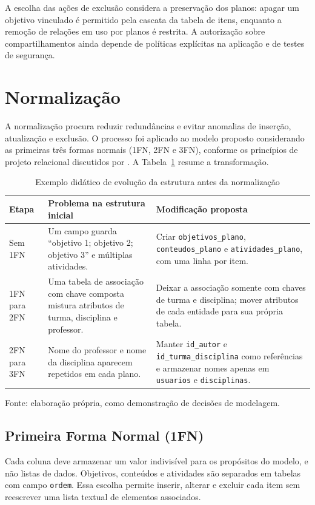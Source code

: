 \documentclass[12pt,a4paper,oneside]{report}
\begin{document}
A escolha das ações de exclusão considera a preservação dos planos: apagar um objetivo vinculado é permitido pela cascata da tabela de itens, enquanto a remoção de relações em uso por planos é restrita. A autorização sobre compartilhamentos ainda depende de políticas explícitas na aplicação e de testes de segurança.

\section{Normalização}
A normalização procura reduzir redundâncias e evitar anomalias de inserção, atualização e exclusão. O processo foi aplicado ao modelo proposto considerando as primeiras três formas normais (1FN, 2FN e 3FN), conforme os princípios de projeto relacional discutidos por \citet{silberschatz2020}. A Tabela~\ref{tab:normalizacao-exemplo} resume a transformação.

\begin{table}[htbp]
\centering
\caption{Exemplo didático de evolução da estrutura antes da normalização}
\label{tab:normalizacao-exemplo}
\footnotesize
\begin{tabularx}{\textwidth}{@{}p{2.1cm}X X@{}}
\toprule
\textbf{Etapa} & \textbf{Problema na estrutura inicial} & \textbf{Modificação proposta} \\
\midrule
Sem 1FN & Um campo guarda ``objetivo 1; objetivo 2; objetivo 3'' e múltiplas atividades. & Criar \texttt{objetivos\_plano}, \texttt{conteudos\_plano} e \texttt{atividades\_plano}, com uma linha por item. \\
1FN para 2FN & Uma tabela de associação com chave composta mistura atributos de turma, disciplina e professor. & Deixar a associação somente com chaves de turma e disciplina; mover atributos de cada entidade para sua própria tabela. \\
2FN para 3FN & Nome do professor e nome da disciplina aparecem repetidos em cada plano. & Manter \texttt{id\_autor} e \texttt{id\_turma\_disciplina} como referências e armazenar nomes apenas em \texttt{usuarios} e \texttt{disciplinas}. \\
\bottomrule
\end{tabularx}
\par\smallskip\begin{minipage}{\textwidth}\footnotesize Fonte: elaboração própria, como demonstração de decisões de modelagem.\end{minipage}
\end{table}

\subsection{Primeira Forma Normal (1FN)}
Cada coluna deve armazenar um valor indivisível para os propósitos do modelo, e não listas de dados. Objetivos, conteúdos e atividades são separados em tabelas com campo \texttt{ordem}. Essa escolha permite inserir, alterar e excluir cada item sem reescrever uma lista textual de elementos associados.
\end{document}
